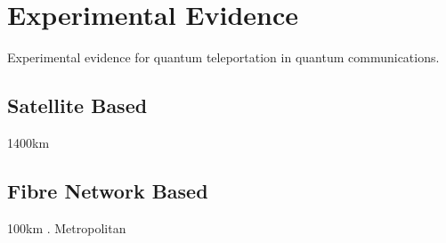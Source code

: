 \section{Experimental Evidence}
Experimental evidence for quantum teleportation in quantum communications.
\subsection{Satellite Based}
1400km \cite{Ren:2017}

\subsection{Fibre Network Based}
100km \cite{Takesue:2015}. Metropolitan \cite{Valivarthi:2016}